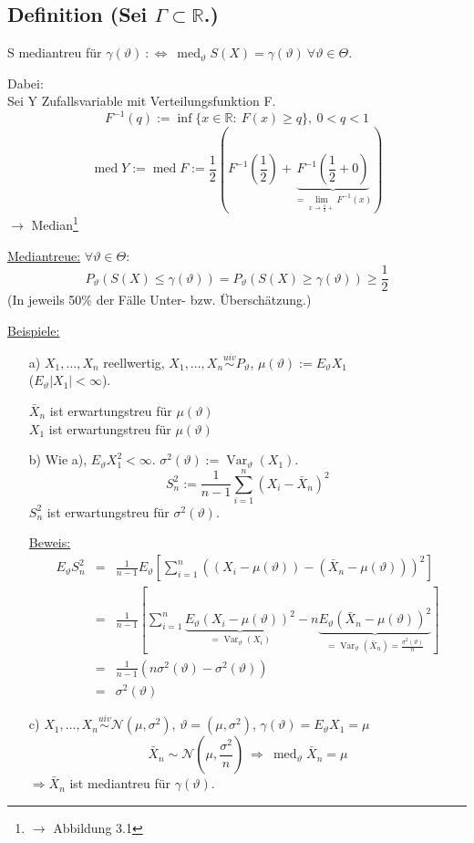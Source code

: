 \documentclass[a4paper,11pt,twoside,titlepage]{article}
\newcommand{\R}{{\mathbb R}}
\newcommand\NN{ \mathcal{N} } %
\newcommand{\uiv}{\ensuremath{\stackrel{uiv}{\sim}}}
\DeclareMathOperator{\var}{Var}
\DeclareMathOperator{\med}{med}
\begin{document}
\subsection{Definition \textnormal{(Sei $\Gamma\subset\R$.)}}
S mediantreu für $\gamma(\vartheta)\ :\Leftrightarrow\ \med_\vartheta S(X)=\gamma(\vartheta)\ \forall\vartheta\in\Theta$.

Dabei:\\
Sei Y Zufallsvariable mit Verteilungsfunktion F.
\[F^{-1}(q):=\inf\{x\in\R:\ F(x)\geq q\},\ 0<q<1\]
\[\med Y:=\med F:=\frac12(F^{-1}(\frac12)+\underbrace{F^{-1}(\frac12+0)}_{=\lim_{x\to\frac12+}F^{-1}(x)})\]
$\rightarrow$ Median\footnote{$\rightarrow$ Abbildung 3.1}

\underline{Mediantreue:} $\forall\vartheta\in\Theta$:
\[P_\vartheta(S(X)\leq\gamma(\vartheta))=P_\vartheta(S(X)\geq\gamma(\vartheta))\geq\frac12\]
(In jeweils 50\% der Fälle Unter- bzw. Überschätzung.)

\underline{Beispiele:}
\begin{itemize}
\item[a)] $X_1,\ldots,X_n$ reellwertig, $X_1,\ldots,X_n\uiv P_\vartheta$, $\mu(\vartheta):=E_\vartheta X_1$\\ ($E_\vartheta|X_1|<\infty$).

$\bar X_n$ ist erwartungstreu für $\mu(\vartheta)$\\
$X_1$ ist erwartungstreu für $\mu(\vartheta)$
\item[b)] Wie a), $E_\vartheta X_1^2<\infty$. $\sigma^2(\vartheta):=\var_\vartheta(X_1)$.
\[S_n^2:=\frac{1}{n-1}\sum_{i=1}^n(X_i-\bar X_n)^2\]
$S_n^2$ ist erwartungstreu für $\sigma^2(\vartheta)$.

\underline{Beweis:}
\begin{eqnarray*}
E_\vartheta S_n^2&=&\frac{1}{n-1}E_\vartheta\left[\sum_{i=1}^n((X_i-\mu(\vartheta))-(\bar X_n-\mu(\vartheta)))^2\right]\\
&=&\frac{1}{n-1}\left[\sum_{i=1}^n\underbrace{E_\vartheta(X_i-\mu(\vartheta))^2}_{=\var_\vartheta(X_i)}-n\underbrace{E_\vartheta(\bar X_n-\mu(\vartheta))^2}_{=\var_\vartheta(\bar X_n)=\frac{\sigma^2(\vartheta)}{n}}\right]\\
&=&\frac{1}{n-1}(n\sigma^2(\vartheta)-\sigma^2(\vartheta))\\
&=&\sigma^2(\vartheta)\end{eqnarray*}
\item[c)] $X_1,\ldots,X_n\uiv\NN(\mu,\sigma^2)$, $\vartheta=(\mu,\sigma^2)$, $\gamma(\vartheta)=E_\vartheta X_1=\mu$
\[\bar X_n\sim\NN(\mu,\frac{\sigma^2}{n})\ \Rightarrow\ \med_\vartheta\bar X_n=\mu\]
$\Rightarrow \bar X_n$ ist mediantreu für $\gamma(\vartheta)$.
\end{itemize}
\end{document}
